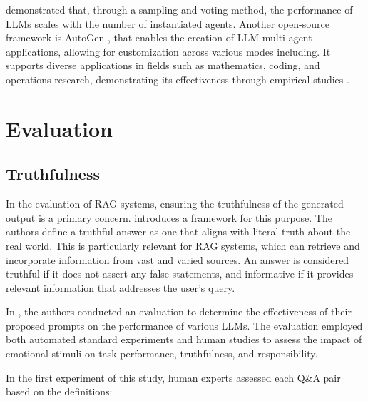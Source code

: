             \citet{Li2024} demonstrated that, through a sampling and voting method, the performance of LLMs scales with the number of instantiated agents.
            Another open-source framework is AutoGen \citep{Wu2023}, that enables the creation of LLM multi-agent applications, allowing for customization across various modes including. It supports diverse applications in fields such as mathematics, coding, and operations research, demonstrating its effectiveness through empirical studies \citep{Wu2023}.

            
        \section{Evaluation} \label{sec:evaluation-review}

            \subsection{Truthfulness}

                In the evaluation of RAG systems, ensuring the truthfulness of the generated output is a primary concern. \citet{Lin2022} introduces a framework for this purpose. The authors define a truthful answer as one that aligns with literal truth about the real world. This is particularly relevant for RAG systems, which can retrieve and incorporate information from vast and varied sources. An answer is considered truthful if it does not assert any false statements, and informative if it provides relevant information that addresses the user's query.
                
                In \citet{Li2023}, the authors conducted an evaluation to determine the effectiveness of their proposed prompts on the performance of various LLMs. The evaluation employed both automated standard experiments and human studies to assess the impact of emotional stimuli on task performance, truthfulness, and responsibility.

                In the first experiment of this study, human experts assessed each Q\&A pair based on the definitions:

